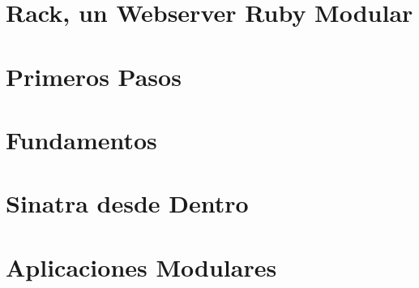 \chapter{Rack, un Webserver Ruby Modular}
\label{chapter:rack}


\chapter{Primeros Pasos}


\chapter{Fundamentos}



\chapter{Sinatra desde Dentro}



\chapter{Aplicaciones Modulares}


